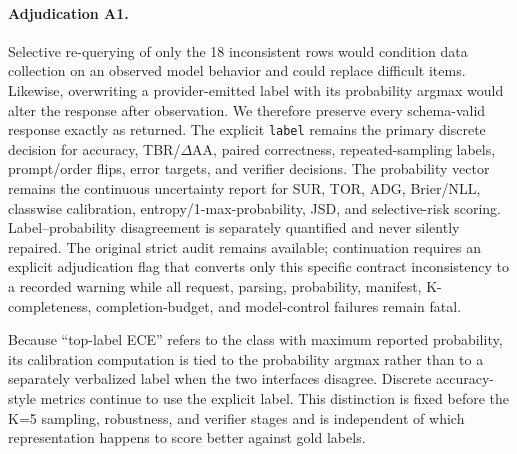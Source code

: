 \paragraph{Adjudication A1.}
Selective re-querying of only the 18 inconsistent rows would condition data collection on an observed model behavior and could replace difficult items. Likewise, overwriting a provider-emitted label with its probability argmax would alter the response after observation. We therefore preserve every schema-valid response exactly as returned. The explicit \texttt{label} remains the primary discrete decision for accuracy, TBR/$\Delta$AA, paired correctness, repeated-sampling labels, prompt/order flips, error targets, and verifier decisions. The probability vector remains the continuous uncertainty report for SUR, TOR, ADG, Brier/NLL, classwise calibration, entropy/1-max-probability, JSD, and selective-risk scoring. Label--probability disagreement is separately quantified and never silently repaired. The original strict audit remains available; continuation requires an explicit adjudication flag that converts only this specific contract inconsistency to a recorded warning while all request, parsing, probability, manifest, K-completeness, completion-budget, and model-control failures remain fatal.

Because ``top-label ECE'' refers to the class with maximum reported probability, its calibration computation is tied to the probability argmax rather than to a separately verbalized label when the two interfaces disagree. Discrete accuracy-style metrics continue to use the explicit label. This distinction is fixed before the K=5 sampling, robustness, and verifier stages and is independent of which representation happens to score better against gold labels.
